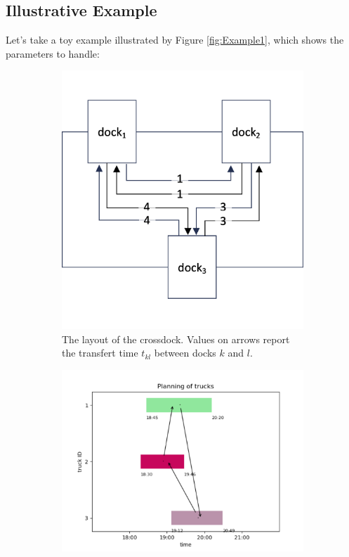 \documentclass[preprint,12pt,authoryear]{elsarticle}
\begin{document}
\subsection{Illustrative Example}
Let's take a toy example illustrated by Figure \ref{fig:Example1}, which shows the parameters to handle:
    \begin{figure}[h!]
    \begin{subfigure}{0.425\textwidth}
    \centering
      \includegraphics[scale=0.11]{images/exemple1Crossdock.png} 
      \caption{The layout of the crossdock. Values on arrows report the transfert time $t_{kl}$ between docks $k$ and $l$.}
      \label{fig:layoutexample}
    \end{subfigure}
    \hfill
    \begin{subfigure}{0.525\textwidth}
    \centering
      \includegraphics[scale=0.17]{images/exemple1Planning.png}

\end{subfigure}
\end{figure}
\end{document}
